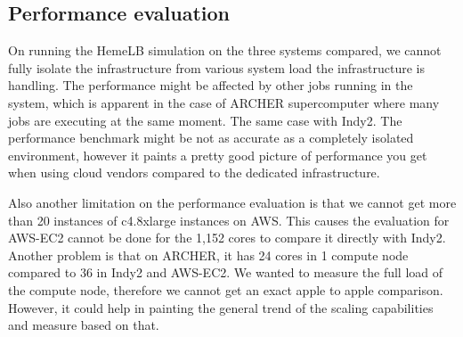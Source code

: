\subsection{Performance evaluation}

On running the HemeLB simulation on the three systems compared, we cannot fully isolate the infrastructure from various system load the infrastructure is handling. The performance might be affected by other jobs running in the system, which is apparent in the case of ARCHER supercomputer where many jobs are executing at the same moment. The same case with Indy2. The performance benchmark might be not as accurate as a completely isolated environment, however it paints a pretty good picture of performance you get when using cloud vendors compared to the dedicated infrastructure. 

Also another limitation on the performance evaluation is that we cannot get more than 20 instances of c4.8xlarge instances on AWS. This causes the evaluation for AWS-EC2 cannot be done for the 1,152 cores to compare it directly with Indy2. Another problem is that on ARCHER, it has 24 cores in 1 compute node compared to 36 in Indy2 and AWS-EC2. We wanted to measure the full load of the compute node, therefore we cannot get an exact apple to apple comparison. However, it could help in painting the general trend of the scaling capabilities and measure based on that.
 
